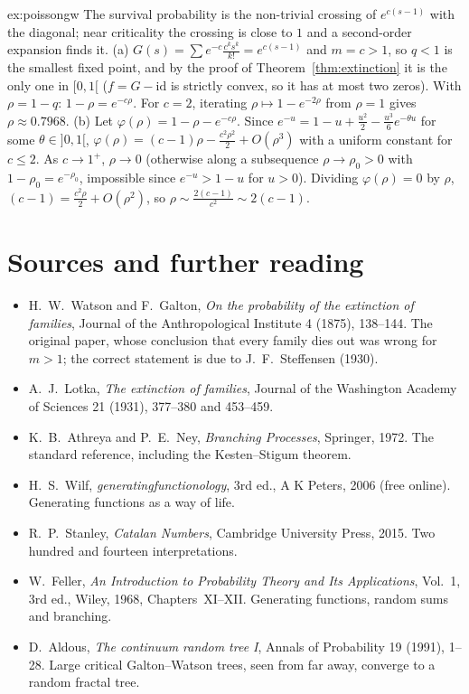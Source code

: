 \begin{solution}{ex:poissongw}
\idea The survival probability is the non-trivial crossing of $e^{c(s-1)}$ with the diagonal; near criticality the crossing is
close to $1$ and a second-order expansion finds it.
\writeup (a) $G(s)=\sum e^{-c}\frac{c^ks^k}{k!}=e^{c(s-1)}$ and $m=c>1$, so $q<1$ is the smallest fixed point, and by the proof of
Theorem~\ref{thm:extinction} it is the only one in $[0,1[$ ($f=G-\mathrm{id}$ is strictly convex, so it has at most two zeros). With $\rho=1-q$:
$1-\rho=e^{-c\rho}$. For $c=2$, iterating $\rho\mapsto1-e^{-2\rho}$ from $\rho=1$ gives $\rho\approx0.7968$.
(b) Let $\varphi(\rho)=1-\rho-e^{-c\rho}$. Since $e^{-u}=1-u+\frac{u^2}2-\frac{u^3}6e^{-\theta u}$ for some $\theta\in]0,1[$, $\varphi(\rho)=(c-1)\rho-\frac{c^2\rho^2}2+O(\rho^3)$ with a
uniform constant for $c\le2$. As $c\to1^+$, $\rho\to0$ (otherwise along a subsequence $\rho\to\rho_0>0$ with $1-\rho_0=e^{-\rho_0}$, impossible
since $e^{-u}>1-u$ for $u>0$). Dividing $\varphi(\rho)=0$ by $\rho$, $(c-1)=\frac{c^2\rho}2+O(\rho^2)$, so $\rho\sim\frac{2(c-1)}{c^2}\sim2(c-1)$.
\end{solution}

\section*{Sources and further reading}

\begin{itemize}
\item H.~W.~Watson and F.~Galton, \emph{On the probability of the extinction of families}, Journal of the
Anthropological Institute 4 (1875), 138--144. The original paper, whose conclusion that every family dies out was wrong
for $m>1$; the correct statement is due to J.~F.~Steffensen (1930).
\item A.~J.~Lotka, \emph{The extinction of families}, Journal of the Washington Academy of Sciences 21 (1931),
377--380 and 453--459.
\item K.~B.~Athreya and P.~E.~Ney, \emph{Branching Processes}, Springer, 1972. The standard reference, including the
Kesten--Stigum theorem.
\item H.~S.~Wilf, \emph{generatingfunctionology}, 3rd ed., A K Peters, 2006 (free online). Generating functions as a
way of life.
\item R.~P.~Stanley, \emph{Catalan Numbers}, Cambridge University Press, 2015. Two hundred and fourteen
interpretations.
\item W.~Feller, \emph{An Introduction to Probability Theory and Its Applications}, Vol.~1, 3rd ed., Wiley, 1968,
Chapters~XI--XII. Generating functions, random sums and branching.
\item D.~Aldous, \emph{The continuum random tree I}, Annals of Probability 19 (1991), 1--28. Large critical
Galton--Watson trees, seen from far away, converge to a random fractal tree.
\end{itemize}
